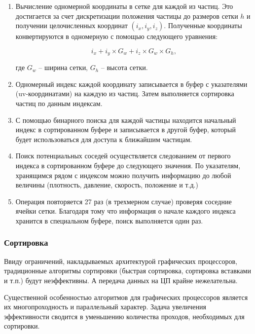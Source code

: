 \begin{enumerate}
  \item Вычисление одномерной координаты в сетке для каждой из частиц. Это достигается за счет
    дискретизации положения частицы до размеров сетки $h$ и получении целочисленных координат
    $(i_x, i_y, i_z)$. Полученные координаты конвертируются в одномерную с помощью следующего
    уравнения:

    \begin{equation}
    \label{eq:}
      i_x + i_y \times G_w + i_z \times G_w \times G_h,
    \end{equation}

    где $G_w$ -- ширина сетки, $G_h$ -- высота сетки.

  \item Одномерный индекс каждой координату записывается в буфер с указателями (uv-координатами)
    на каждую из частиц. Затем выполняется сортировка частиц по данным индексам.

  \item С помощью бинарного поиска для каждой частицы находится начальный индекс в сортированном
    буфере и записывается в другой буфер, который будет использоваться для доступа к ближайшим
    частицам.

  \item Поиск потенциальных соседей осуществляется следованием от первого индекса в сортированном
    буфере до следующего значения. По указателям, хранящимся рядом с индексом можно получить 
    информацию до любой величины (плотность, давление, скорость, положение и т.д.)

  \item Операция повторяется 27 раз (в трехмерном случае) проверяя соседние ячейки сетки.
    Благодаря тому что информация о начале каждого индекса хранится в специальном буфере,
    поиск выполняется один раз.

\end{enumerate}

\subsubsection{Сортировка}

Ввиду ограничений, накладываемых архитектурой графических процессоров, традиционные алгоритмы
сортировки (быстрая сортировка, сортировка вставками и т.п.) будут неэффективны. А передача
данных на ЦП крайне нежелательна.

Существенной особенностью алгоритмов для графических процессоров является их многопроходность
и параллельный характер. Задача увеличения эффективности сводится в уменьшению количества
проходов, необходимых для сортировки.

